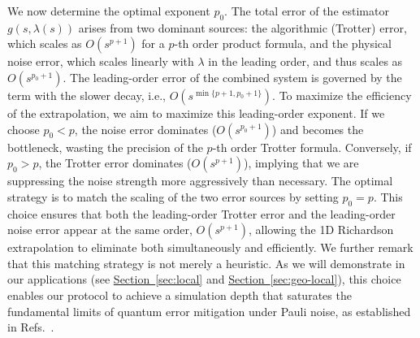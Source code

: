 \documentclass[aps,pra,reprint,groupedaddress,floatfix]{revtex4-2}
\renewcommand{\sec}[1]{\hyperref[sec:#1]{Section~\ref*{sec:#1}}}
\begin{document}
We now determine the optimal exponent $p_0$. The total error of the estimator $g(s, \lambda(s))$ arises from two dominant sources: the algorithmic (Trotter) error, which scales as $O(s^{p+1})$ for a $p$-th order product formula, and the physical noise error, which scales linearly with $\lambda$ in the leading order, and thus scales as $O(s^{p_0+1})$.
The leading-order error of the combined system is governed by the term with the slower decay, i.e., $O(s^{\min\{p+1, p_0+1\}})$. To maximize the efficiency of the extrapolation, we aim to maximize this leading-order exponent. If we choose $p_0 < p$, the noise error dominates ($O(s^{p_0+1})$) and becomes the bottleneck, wasting the precision of the $p$-th order Trotter formula. Conversely, if $p_0 > p$, the Trotter error dominates ($O(s^{p+1})$), implying that we are suppressing the noise strength more aggressively than necessary.
The optimal strategy is to match the scaling of the two error sources by setting $p_0 = p$. This choice ensures that both the leading-order Trotter error and the leading-order noise error appear at the same order, $O(s^{p+1})$, allowing the 1D Richardson extrapolation to eliminate both simultaneously and efficiently. We further remark that this matching strategy is not merely a heuristic. As we will demonstrate in our applications (see \sec{local} and \sec{geo-local}), this choice enables our protocol to achieve a simulation depth that saturates the fundamental limits of quantum error mitigation under Pauli noise, as established in Refs.~\cite{wang2021noise, cai2021multi}.
\end{document}
